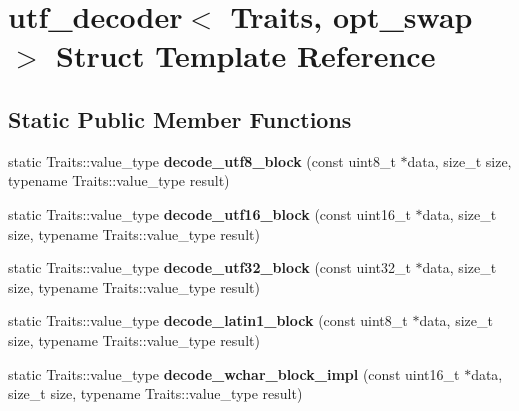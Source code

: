 \hypertarget{structutf__decoder}{\section{utf\-\_\-decoder$<$ Traits, opt\-\_\-swap $>$ Struct Template Reference}
\label{structutf__decoder}
}
\subsection*{Static Public Member Functions}
\begin{DoxyCompactItemize}
\item 
\hypertarget{structutf__decoder_a671829bbdba1eac5c8bd2bf781eae498}{static Traits\-::value\-\_\-type {\bfseries decode\-\_\-utf8\-\_\-block} (const uint8\-\_\-t $\ast$data, size\-\_\-t size, typename Traits\-::value\-\_\-type result)}\label{structutf__decoder_a671829bbdba1eac5c8bd2bf781eae498}

\item 
\hypertarget{structutf__decoder_ac22afd983ac79318f0e7d07669bda8d1}{static Traits\-::value\-\_\-type {\bfseries decode\-\_\-utf16\-\_\-block} (const uint16\-\_\-t $\ast$data, size\-\_\-t size, typename Traits\-::value\-\_\-type result)}\label{structutf__decoder_ac22afd983ac79318f0e7d07669bda8d1}

\item 
\hypertarget{structutf__decoder_a8bed41cc707328e8d8ab91fd7c3c943e}{static Traits\-::value\-\_\-type {\bfseries decode\-\_\-utf32\-\_\-block} (const uint32\-\_\-t $\ast$data, size\-\_\-t size, typename Traits\-::value\-\_\-type result)}\label{structutf__decoder_a8bed41cc707328e8d8ab91fd7c3c943e}

\item 
\hypertarget{structutf__decoder_a3f728755fa7cc552e30e8d8776cad1ce}{static Traits\-::value\-\_\-type {\bfseries decode\-\_\-latin1\-\_\-block} (const uint8\-\_\-t $\ast$data, size\-\_\-t size, typename Traits\-::value\-\_\-type result)}\label{structutf__decoder_a3f728755fa7cc552e30e8d8776cad1ce}

\item 
\hypertarget{structutf__decoder_a56b161067860fde1ed534ac3b7399e36}{static Traits\-::value\-\_\-type {\bfseries decode\-\_\-wchar\-\_\-block\-\_\-impl} (const uint16\-\_\-t $\ast$data, size\-\_\-t size, typename Traits\-::value\-\_\-type result)}\label{structutf__decoder_a56b161067860fde1ed534ac3b7399e36}


\end{DoxyCompactItemize}
